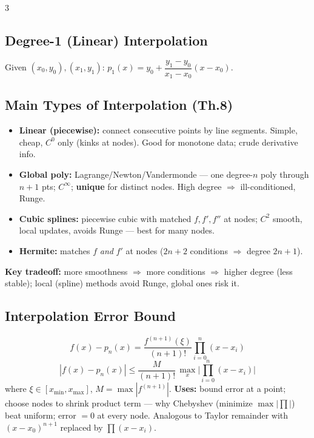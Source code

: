 \documentclass[9pt]{extarticle}
\newcommand{\hl}[1]{\textbf{\textcolor{BrickRed}{#1}}}
\begin{document}
\begin{multicols}{3}
\subsection{Degree-1 (Linear) Interpolation}
Given $(x_0,y_0),(x_1,y_1)$: $p_1(x)=y_0+\dfrac{y_1-y_0}{x_1-x_0}(x-x_0)$.

\subsection{Main Types of Interpolation (Th.8)}
\begin{itemize}
\item \hl{Linear (piecewise):} connect consecutive points by line segments. Simple, cheap, $C^0$ only (kinks at nodes). Good for monotone data; crude derivative info.
\item \hl{Global poly:} Lagrange/Newton/Vandermonde — one degree-$n$ poly through $n{+}1$ pts; $C^\infty$; \hl{unique} for distinct nodes. High degree $\Rightarrow$ ill-conditioned, Runge.
\item \hl{Cubic splines:} piecewise cubic with matched $f,f',f''$ at nodes; $C^2$ smooth, local updates, avoids Runge — best for many nodes.
\item \hl{Hermite:} matches $f$ \emph{and} $f'$ at nodes ($2n{+}2$ conditions $\Rightarrow$ degree $2n{+}1$).
\end{itemize}
\hl{Key tradeoff:} more smoothness $\Rightarrow$ more conditions $\Rightarrow$ higher degree (less stable); local (spline) methods avoid Runge, global ones risk it.

\subsection{Interpolation Error Bound}
\begin{equation*}
f(x)-p_n(x)=\frac{f^{(n+1)}(\xi)}{(n+1)!}\prod_{i=0}^{n}(x-x_i)
\end{equation*}
\begin{equation*}
|f(x)-p_n(x)|\le\frac{M}{(n+1)!}\,\max_x\Big|\prod_{i=0}^n(x-x_i)\Big|
\end{equation*}
where $\xi\in[x_{\min},x_{\max}]$, $M=\max|f^{(n+1)}|$.
\hl{Uses:} bound error at a point; choose nodes to shrink product term — why Chebyshev (minimize $\max|\prod|$) beat uniform; error $=0$ at every node. Analogous to Taylor remainder with $(x-x_0)^{n+1}$ replaced by $\prod(x-x_i)$.


\end{multicols}
\end{document}

